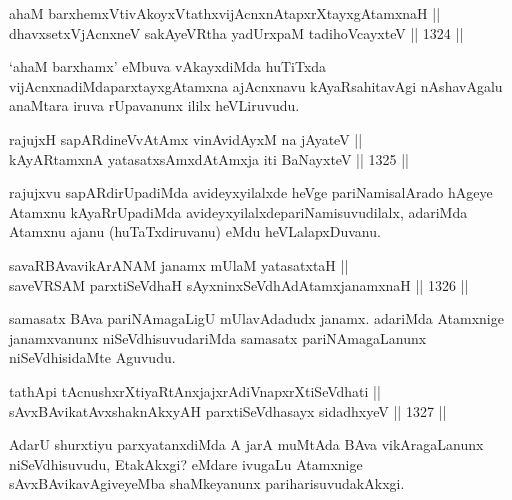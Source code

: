 
\begin{shl}
ahaM barxhemxVtivAkoyxVtathxvijAcnxnAtapxrXtayxgAtamxnaH ||  \\
dhavxsetxV\s jAcnxneV sakAyeVR\s tha yadUrxpaM tadihoVcayxteV \hfill || 1324 ||  
\end{shl}

\begin{artha}
`ahaM barxhamx' eMbuva vAkayxdiMda huTiTxda vijAcnxnadiMda\break parxtayxgAtamxna ajAcnxnavu kAyaRsahitavAgi nAshavAgalu anaMtara iruva rUpavanunx ililx heVLiruvudu.
\end{artha}

\begin{shl}
rajujxH sapARdineVvA\s \s tAmx vinA\s vidAyxM na jAyateV || \\
kAyARtamxnA yatasatxsAmxdAtAmx\s ja iti BaNayxteV \hfill || 1325 ||  
\end{shl}

\begin{artha}
rajujxvu sapARdirUpadiMda avideyxyilalxde heVge pariNamisalArado hAgeye Atamxnu kAyaRrUpadiMda avideyxyilalxde\break pariNamisuvudilalx, adariMda Atamxnu ajanu (huTaTxdiruvanu) eMdu heVLalapxDuvanu.
\end{artha}


\begin{shl}
savaRBAvavikArANAM janamx mUlaM yatasatxtaH || \\
saveVRSAM parxtiSeVdhaH sAyxninxSeVdhAdAtamxjanamxnaH \hfill || 1326 ||  
\end{shl}

\begin{artha}
samasatx BAva pariNAmagaLigU mUlavAdadudx janamx. adariMda Atamxnige janamxvanunx niSeVdhisuvudariMda samasatx pariNAmagaLanunx niSeVdhisidaMte Aguvudu.
\end{artha}


\begin{shl}
tathA\s pi tAcnushxrXtiyaRtAnxjajxrAdiVnapxrXtiSeVdhati || \\
sAvxBAvikatAvxshaknAkxyAH parxtiSeVdhasayx sidadhxyeV \hfill || 1327 ||  
\end{shl}

\begin{artha}
AdarU shurxtiyu parxyatanxdiMda A jarA muMtAda BAva vikAragaLanunx niSeVdhisuvudu, EtakAkxgi? eMdare ivugaLu Atamxnige sAvxBAvikavAgiveyeMba shaMkeyanunx pariharisuvudakAkxgi.
\end{artha}

